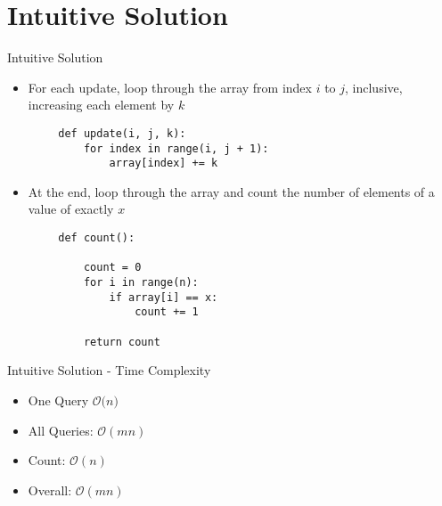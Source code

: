 \documentclass{beamer}
\begin{document}
\section{Intuitive Solution}
\begin{frame}[fragile]{Intuitive Solution}
    \begin{itemize}
        \item For each update, loop through the array from index $i$ to $j$, inclusive, increasing each element by $k$
    \end{itemize}

    \begin{lstlisting}
        def update(i, j, k):
            for index in range(i, j + 1):
                array[index] += k
    \end{lstlisting}
    
    \begin{itemize}
        \item At the end, loop through the array and count the number of elements of a value of exactly $x$
    \end{itemize}
    
    \begin{lstlisting}
        def count():
        
            count = 0
            for i in range(n):
                if array[i] == x:
                    count += 1
            
            return count
    \end{lstlisting}
\end{frame}

\begin{frame}{Intuitive Solution - Time Complexity}
\begin{itemize}
    \item One Query $\mathcal{O}({n)}$
    \item All Queries: $\mathcal{O}{(mn)}$
    \item Count: $\mathcal{O}{(n)}$
    \item Overall: $\mathcal{O}{(mn)}$
\end{itemize}
\end{frame}
\end{document}
